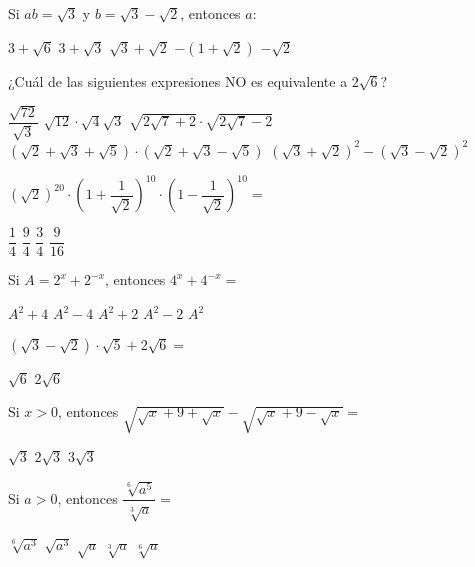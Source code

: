 \documentclass[pagina vacia]{srs}
\begin{document}
\begin{preguntas}
\pregunta Si \(ab = \sqrt{3}\) y \(b = \sqrt{3} - \sqrt{2}\), entonces \(a:\)
\begin{vertical}
\alternativa \(3 + \sqrt{6}\)
\alternativa \(3 + \sqrt{3}\)
\alternativa \(\sqrt{3} + \sqrt{2}\)
\alternativa \(-(1 + \sqrt{2})\)
\alternativa \(-\sqrt{2}\)
\end{vertical}

\pregunta ¿Cuál de las siguientes expresiones NO es equivalente a \(2\sqrt{6}\)?
\begin{vertical}
\alternativa \(\dfrac{\sqrt{72}}{\sqrt{3}}\)
\alternativa \(\sqrt{12} \cdot \sqrt{4}\sqrt{3}\)
\alternativa \(\sqrt{2\sqrt{7}+2} \cdot \sqrt{2\sqrt{7}-2}\)
\alternativa \((\sqrt{2}+\sqrt{3}+\sqrt{5}) \cdot (\sqrt{2}+\sqrt{3}-\sqrt{5})\)
\alternativa \((\sqrt{3}+\sqrt{2})^2 - (\sqrt{3}-\sqrt{2})^2\)
\end{vertical}

\pregunta \((\sqrt{2})^{20} \cdot \left(1 + \dfrac{1}{\sqrt{2}}\right)^{10} \cdot \left(1 - \dfrac{1}{\sqrt{2}}\right)^{10} =\)
\begin{vertical}
\alternativa \(\dfrac{1}{4}\)
\alternativa \(\dfrac{9}{4}\)
\alternativa \(\dfrac{3}{4}\)
\alternativa \(\dfrac{9}{16}\)
\end{vertical}

\pregunta Si \(A = 2^x + 2^{-x}\), entonces \(4^x + 4^{-x} =\)
\begin{vertical}
\alternativa \(A^2 + 4\)
\alternativa \(A^2 - 4\)
\alternativa \(A^2 + 2\)
\alternativa \(A^2 - 2\)
\alternativa \(A^2\)
\end{vertical}

\pregunta \((\sqrt{3}-\sqrt{2})\cdot\sqrt{5} + 2\sqrt{6} =\)
\begin{vertical}
\alternativa \(\sqrt{6}\)
\alternativa \(2\sqrt{6}\)
\end{vertical}

\pregunta Si \(x > 0\), entonces \(\sqrt{\sqrt{x}+9+\sqrt{x}} - \sqrt{\sqrt{x}+9-\sqrt{x}} =\)
\begin{vertical}
\alternativa \(\sqrt{3}\)
\alternativa \(2\sqrt{3}\)
\alternativa \(3\sqrt{3}\)
\end{vertical}

\pregunta Si \(a > 0\), entonces \(\dfrac{\sqrt[6]{a^5}}{\sqrt[3]{a}} =\)
\begin{vertical}
\alternativa \(\sqrt[6]{a^3}\)
\alternativa \(\sqrt{a^3}\)
\alternativa \(\sqrt{a}\)
\alternativa \(\sqrt[3]{a}\)
\alternativa \(\sqrt[6]{a}\)
\end{vertical}


\end{preguntas}
\end{document}
